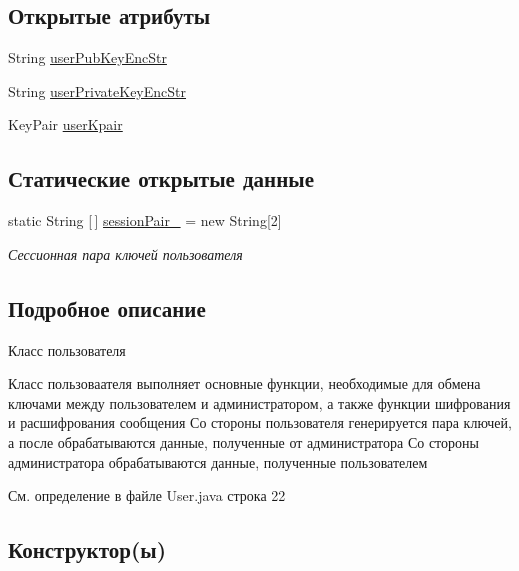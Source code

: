 \subsection*{Открытые атрибуты}
\begin{DoxyCompactItemize}
\item 
String \mbox{\hyperlink{classcom_1_1example_1_1firebasechat_1_1_user_a92f14106f35b17ca627b7a5ca0dd3d02}{user\+Pub\+Key\+Enc\+Str}}
\item 
String \mbox{\hyperlink{classcom_1_1example_1_1firebasechat_1_1_user_a210e28a59a8e53a7deb7e18027875173}{user\+Private\+Key\+Enc\+Str}}
\item 
Key\+Pair \mbox{\hyperlink{classcom_1_1example_1_1firebasechat_1_1_user_a4d6f0638b114faeb2b30a6736ef46cf8}{user\+Kpair}}
\end{DoxyCompactItemize}
\subsection*{Статические открытые данные}
\begin{DoxyCompactItemize}
\item 
static String \mbox{[}$\,$\mbox{]} \mbox{\hyperlink{classcom_1_1example_1_1firebasechat_1_1_user_a2e442876539909f5f9725196556d5fa7}{session\+Pair\+\_\+}} = new String\mbox{[}2\mbox{]}
\begin{DoxyCompactList}\small\item\em Сессионная пара ключей пользователя \end{DoxyCompactList}\end{DoxyCompactItemize}


\subsection{Подробное описание}
Класс пользователя 

Класс пользоваателя выполняет основные функции, необходимые для обмена ключами между пользователем и администратором, а также функции шифрования и расшифрования сообщения Со стороны пользователя генерируется пара ключей, а после обрабатываются данные, полученные от администратора Со стороны администратора обрабатываются данные, полученные пользователем 

См. определение в файле User.\+java строка 22



\subsection{Конструктор(ы)}
\mbox{\label{classcom_1_1example_1_1firebasechat_1_1_user_adc3b037f7e367a6aa8aaac01360d5340}} 
